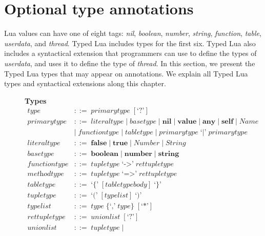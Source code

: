 \section{Optional type annotations}

Lua values can have one of eight tags:
\emph{nil}, \emph{boolean}, \emph{number}, \emph{string},
\emph{function}, \emph{table}, \emph{userdata}, and \emph{thread}.
Typed Lua includes types for the first six.
Typed Lua also includes a syntactical extension that programmers can use
to define the types of \emph{userdata}, and uses it to define the type of \emph{thread}. 
In this section, we present the Typed Lua types that may appear on annotations.
We explain all Typed Lua types and syntactical extensions along this chapter.

\begin{figure}[!ht]
\textbf{Types}\\
\dstart
\begin{align*}
\textit{type} & ::= \; \textit{primarytype} \; [\texttt{`?'}]\\
\textit{primarytype} & ::= \; \textit{literaltype} \; | \;
  \textit{basetype} \; | \;
  \textbf{nil} \; | \;
  \textbf{value} \; | \;
  \textbf{any} \; | \;
  \textbf{self} \; | \;
  \textit{Name}\\
& | \; \textit{functiontype} \; | \;
  \textit{tabletype} \; | \;
  \textit{primarytype} \; \texttt{`|'} \; \textit{primarytype}\\
\textit{literaltype} & ::= \; \textbf{false} \; | \;
  \textbf{true} \; | \;
  \textit{Number} \; | \;
  \textit{String}\\
\textit{basetype} & ::= \; \textbf{boolean} \; | \;
  \textbf{number} \; | \;
  \textbf{string}\\
\textit{functiontype} & ::= \; \textit{tupletype} \; \texttt{`->'} \; \textit{rettupletype}\\
\textit{methodtype} & ::= \; \textit{tupletype} \; \texttt{`=>'} \; \textit{rettupletype}\\
\textit{tabletype} & ::= \; \texttt{`\{'} \; [\textit{tabletypebody}] \; \texttt{`\}'}\\
\textit{tupletype} & ::= \; \texttt{`('} \; [typelist] \; \texttt{`)'}\\
\textit{typelist} & ::= \; \textit{type} \; \{\texttt{`,'} \; \textit{type}\} \; [\texttt{`*'}]\\
\textit{rettupletype} & ::= \; \textit{unionlist} \; [\texttt{`?'}]\\
\textit{unionlist} & ::= \; \textit{tupletype} \; | \;

\end{align*}
\end{figure}
